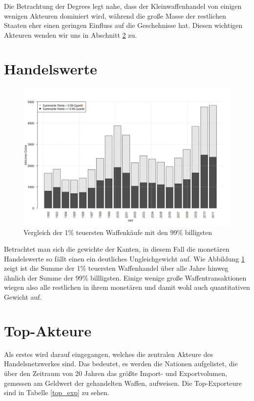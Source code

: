 \documentclass[a4paper,ngerman,oneside,titlepage,bibliography=totoc,11pt]{scrreprt}
\begin{document}
Die Betrachtung der Degrees legt nahe, dass der Kleinwaffenhandel von einigen wenigen Akteuren dominiert wird, während die große Masse der restlichen Staaten eher einen geringen Einfluss auf die Geschehnisse hat. Diesen wichtigen Akteuren wenden wir uns in Abschnitt \ref{sec:top-akteure} zu.

\section{Handelswerte}

\begin{figure}[h]
	\centering
		\includegraphics[width=1.00\textwidth]{Grafiken/ts_value.png}
	\caption{Vergleich der 1\% teuersten Waffenkäufe mit den 99\% billigsten}
	\label{fig:ts_value}
\end{figure}

Betrachtet man sich die gewichte der Kanten, in diesem Fall die monetären Handelswerte so fällt einen ein deutliches Ungleichgewicht auf. Wie Abbildung \ref{fig:ts_value} zeigt ist die Summe der 1\% teuersten Waffenhandel über alle Jahre hinweg ähnlich der Summe der 99\% billligsten. Einige wenige große Waffentransaktionen wiegen also alle restlichen in ihrem monetären und damit wohl auch quantitativen Gewicht auf.

\section{Top-Akteure}
\label{sec:top-akteure}
Als erstes wird darauf eingegangen, welches die zentralen Akteure des Handelsnetzwerkes sind. Das bedeutet, es werden die Nationen aufgelistet, die über den Zeitraum von 20 Jahren das größte Import- und Exportvolumen, gemessen am Geldwert der gehandelten Waffen, aufweisen. Die Top-Exporteure sind in Tabelle \ref{top_exp} zu sehen.
\end{document}
